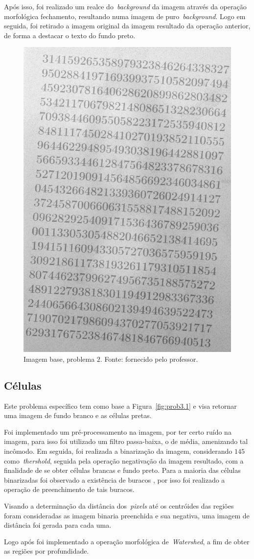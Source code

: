 \documentclass[conference]{Trabalho_2}
\begin{document}
Ap\'os isso, foi realizado um realce do~\textit{background} da imagem atrav\'es da opera\c{c}\~ao morfol\'ogica fechamento, resultando numa imagem de puro~\textit{background}. Logo em seguida, foi retirado a imagem original da imagem resultado da opera\c{c}\~ao anterior, de forma a destacar o texto do fundo preto. 

\begin{figure}[!t]
  \centering
  \includegraphics[width = 4.5 cm]{morf_test}
  \caption{Imagem base, problema $2$. Fonte: fornecido pelo professor.}
  \label{fig:prob2.1}
\end{figure}

\subsection{C\'elulas}
Este problema espec\'ifico tem como base a Figura~\ref{fig:prob3.1} e visa retornar uma imagem de fundo branco e as c\'elulas pretas.

Foi implementado um pr\'e-processamento na imagem, por ter certo ru\'ido na imagem, para isso foi utilizado um filtro passa-baixa, o de m\'edia, amenizando tal inc\^omodo. Em seguida, foi realizada a binariza\c{c}\~ao da imagem, considerando $145$ como~\textit{thershold}, seguida pela opera\c{c}\~ao negativa\c{c}\~ao da imagem resultado, com a finalidade de se obter c\'elulas brancas e fundo preto. Para a maioria das c\'elulas binarizadas foi observado a exist\^encia de buracos , por isso foi realizado a opera\c{c}\~ao de preenchimento de tais buracos.

Visando a determina\c{c}\~ao da dist\^ancia dos~\textit{pixels} at\'e os centr\'oides das regi\~oes foram consideradas as imagem binaria preenchida e sua negativa, uma imagem de dist\^ancia foi gerada para cada uma.

Logo ap\'os foi implementado a opera\c{c}\~ao morfol\'ogica de~\textit{Watershed}, a fim de obter as regi\~oes por profundidade.
\end{document}
